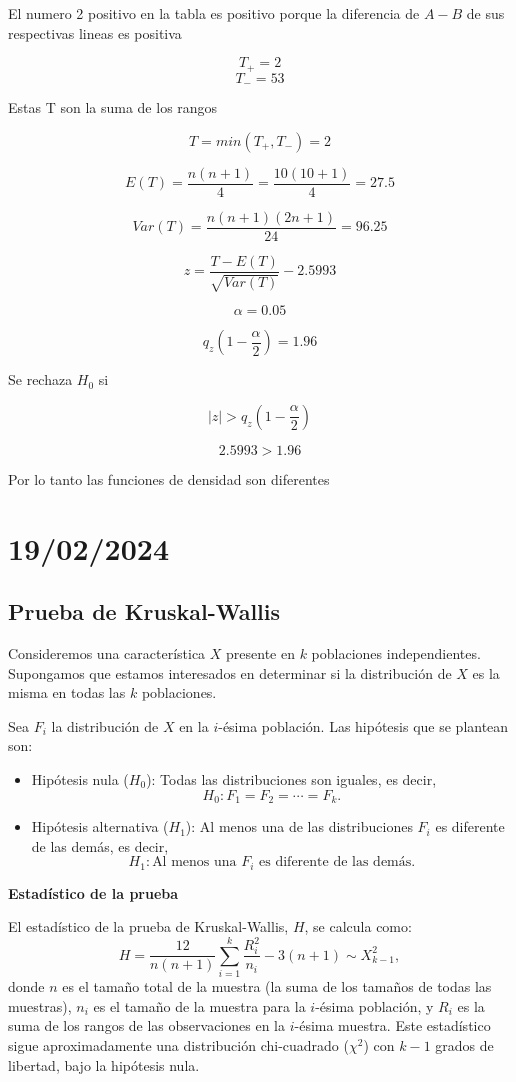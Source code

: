 \documentclass{article}
\begin{document}
El numero 2 positivo en la tabla es positivo porque la diferencia de $A - B$ de sus respectivas lineas es positiva

\[T_{+} = 2\]
\[T_{-} = 53\]

Estas T son la suma de los rangos

\[T = min(T_{+}, T_{-}) = 2\]

\[
    E(T) = \frac{n(n + 1)}{4} = \frac{10(10 + 1)}{4} = 27.5
\]

\[
    Var(T) = \frac{n(n + 1)(2n + 1)}{24} = 96.25
\]

\[
    z = \frac{T - E(T)}{\sqrt{Var(T)}} -2.5993
\]

\[\alpha = 0.05\]

\[q_z(1 - \frac{\alpha}{2}) = 1.96\]

Se rechaza $H_0$ si

\[|z| > q_z(1 - \frac{\alpha}{2})\]

\[2.5993 > 1.96\]

Por lo tanto las funciones de densidad son diferentes

\section{19/02/2024}

\subsection{Prueba de Kruskal-Wallis}

Consideremos una característica $X$ presente en $k$ poblaciones independientes. Supongamos que estamos interesados en determinar si la distribución de $X$ es la misma en todas las $k$ poblaciones.

Sea $F_i$ la distribución de $X$ en la $i$-ésima población. Las hipótesis que se plantean son:

\begin{itemize}
    \item Hipótesis nula ($H_0$): Todas las distribuciones son iguales, es decir,
          \[ H_0: F_1 = F_2 = \cdots = F_k. \]
    \item Hipótesis alternativa ($H_1$): Al menos una de las distribuciones $F_i$ es diferente de las demás, es decir,
          \[ H_1: \text{Al menos una } F_i \text{ es diferente de las demás}. \]
\end{itemize}

\textbf{Estadístico de la prueba}

El estadístico de la prueba de Kruskal-Wallis, $H$, se calcula como:
\[ H = \frac{12}{n(n+1)} \sum_{i=1}^{k} \frac{R_i^2}{n_i} - 3(n+1) \sim X^2_{k-1}, \]
donde $n$ es el tamaño total de la muestra (la suma de los tamaños de todas las muestras), $n_i$ es el tamaño de la muestra para la $i$-ésima población, y $R_i$ es la suma de los rangos de las observaciones en la $i$-ésima muestra. Este estadístico sigue aproximadamente una distribución chi-cuadrado ($\chi^2$) con $k-1$ grados de libertad, bajo la hipótesis nula.
\end{document}
